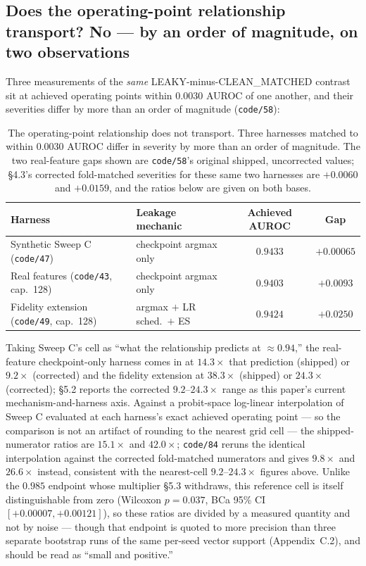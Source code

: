 \documentclass[10pt]{article} %
\begin{document}
\subsection{Does the operating-point relationship transport? No --- by an order of magnitude, on two observations}

Three measurements of the \emph{same} LEAKY-minus-CLEAN\_MATCHED contrast sit
at achieved operating points within $0.0030$ AUROC of one another, and their
severities differ by more than an order of magnitude (\texttt{code/58}):

\begin{table}[!ht]
\centering
\small
\begin{tabular}{llcc}
\toprule
Harness & Leakage mechanic & Achieved AUROC & Gap \\
\midrule
Synthetic Sweep C (\texttt{code/47}) & checkpoint argmax only & $0.9433$ & $+0.00065$ \\
Real features (\texttt{code/43}, cap.\ 128) & checkpoint argmax only & $0.9403$ & $+0.0093$ \\
Fidelity extension (\texttt{code/49}, cap.\ 128) & argmax $+$ LR sched.\ $+$ ES & $0.9424$ & $+0.0250$ \\
\bottomrule
\end{tabular}
\caption{The operating-point relationship does not transport. Three harnesses
matched to within $0.0030$ AUROC differ in severity by more than an order of
magnitude. The two real-feature gaps shown are \texttt{code/58}'s original
shipped, uncorrected values; §4.3's corrected fold-matched severities for these
same two harnesses are $+0.0060$ and $+0.0159$, and the ratios below are given
on both bases.}
\end{table}

Taking Sweep C's cell as ``what the relationship predicts at $\approx0.94$,''
the real-feature checkpoint-only harness comes in at $\mathbf{14.3\times}$ that
prediction (shipped) or $\mathbf{9.2\times}$ (corrected) and the fidelity
extension at $\mathbf{38.3\times}$ (shipped) or $\mathbf{24.3\times}$
(corrected); §5.2 reports the corrected $9.2$--$24.3\times$ range as this
paper's current mechanism-and-harness axis. Against a probit-space log-linear
interpolation of Sweep C evaluated at each harness's exact achieved operating
point --- so the comparison is not an artifact of rounding to the nearest grid
cell --- the shipped-numerator ratios are $15.1\times$ and $42.0\times$;
\texttt{code/84} reruns the identical interpolation against the corrected
fold-matched numerators and gives $\mathbf{9.8\times}$ and $\mathbf{26.6\times}$
instead, consistent with the nearest-cell $9.2$--$24.3\times$ figures above.
Unlike the $0.985$ endpoint whose multiplier §5.3 withdraws, this
reference cell is itself distinguishable from zero (Wilcoxon $p=0.037$, BCa
95\% CI $[+0.00007,+0.00121]$), so these ratios are divided by a measured
quantity and not by noise --- though that endpoint is quoted to more precision
than three separate bootstrap runs of the same per-seed vector support
(Appendix~C.2), and should be read as ``small and positive.''
\end{document}
